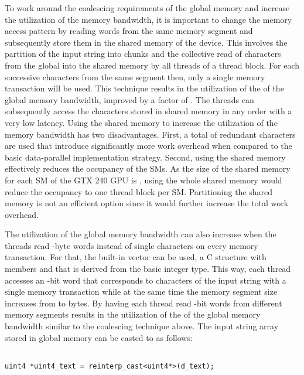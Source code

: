 \documentclass{ws-ijait}
\begin{document}
To work around the coalescing requirements of the global memory and increase the utilization of the memory bandwidth, it is important to change the memory access pattern by reading words from the same memory segment and subsequently store them in the shared memory of the device. This involves the partition of the input string into  chunks and the collective read of  characters from the global into the shared memory by all  threads of a thread block. For each  successive characters from the same segment then, only a single memory transaction will be used. This technique results in the utilization of the  of the global memory bandwidth, improved by a factor of . The threads can subsequently access the characters stored in shared memory in any order with a very low latency. Using the shared memory to increase the utilization of the memory bandwidth has two disadvantages. First, a total of  redundant characters are used that introduce significantly more work overhead when compared to the basic data-parallel implementation strategy. Second, using the shared memory effectively reduces the occupancy of the SMs. As the size of the shared memory for each SM of the GTX 240 GPU is , using the whole shared memory would reduce the occupancy to one thread block per SM. Partitioning the shared memory is not an efficient option since it would further increase the total work overhead.

The utilization of the global memory bandwidth can also increase when the threads read -byte words instead of single characters on every memory transaction. For that, the built-in  vector can be used, a C structure with members  and  that is derived from the basic integer type. This way, each thread accesses an -bit  word that corresponds to  characters of the input string with a single memory transaction while at the same time the memory segment size increases from  to  bytes. By having each thread read -bit  words from different memory segments results in the utilization of the  of the global memory bandwidth similar to the coalescing technique above. The input string array stored in global memory can be casted to  as follows:

\noindent\begin{minipage}{\textwidth}
\begin{lstlisting}
	
uint4 *uint4_text = reinterp_cast<uint4*>(d_text);

\end{lstlisting}
\end{minipage}\\
\end{document}

